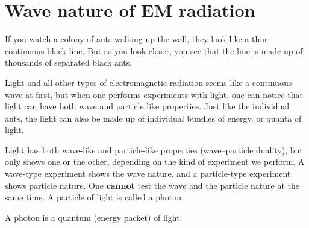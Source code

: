     \label{m38777*cid3}
            \section{Wave nature of EM radiation}
            \nopagebreak
      \label{m38777*id186686}If you watch a colony of ants walking up the wall, they look like a thin continuous black line. But as you look closer, you see that the line is made up of thousands of separated black ants.\par 
      \label{m38777*id187029}Light and all other types of electromagnetic radiation seems like a continuous wave at first, but when one performs experiments with light, one can notice that light can have both wave and particle like properties. Just like the individual ants, the light can also be made up of individual bundles of energy, or quanta of light.\par 
      \label{m38777*id187035}Light has both wave-like and particle-like properties (wave--particle duality), but only shows one or the other, depending on the kind of experiment we perform. A wave-type experiment shows the wave nature, and a particle-type experiment shows particle nature. One \textbf{cannot} test the wave and the particle nature at the same time. A particle of light is called a photon.\par 




\label{m38777*fhsst!!!underscore!!!id75} { \label{m38777*meaningfhsst!!!underscore!!!id75}
      \label{m38777*id187051}A photon is a quantum (energy packet) of light. \par 
       } 


\label{m38777*secfhsst!!!underscore!!!id79}

